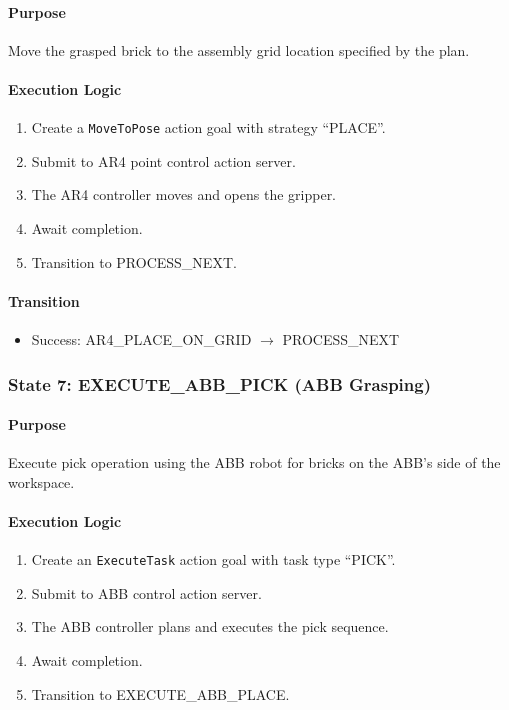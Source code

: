 \paragraph{Purpose}

Move the grasped brick to the assembly grid location specified by the plan.

\paragraph{Execution Logic}

\begin{enumerate}
    \item Create a \texttt{MoveToPose} action goal with strategy ``PLACE''.
    \item Submit to AR4 point control action server.
    \item The AR4 controller moves and opens the gripper.
    \item Await completion.
    \item Transition to PROCESS\_NEXT.
\end{enumerate}

\paragraph{Transition}

\begin{itemize}
    \item Success: AR4\_PLACE\_ON\_GRID $\rightarrow$ PROCESS\_NEXT
\end{itemize}

\subsubsection{State 7: EXECUTE\_ABB\_PICK (ABB Grasping)}
\label{state:executeABBpick}

\paragraph{Purpose}

Execute pick operation using the ABB robot for bricks on the ABB's side of the workspace.

\paragraph{Execution Logic}

\begin{enumerate}
    \item Create an \texttt{ExecuteTask} action goal with task type ``PICK''.
    \item Submit to ABB control action server.
    \item The ABB controller plans and executes the pick sequence.
    \item Await completion.
    \item Transition to EXECUTE\_ABB\_PLACE.
\end{enumerate}

